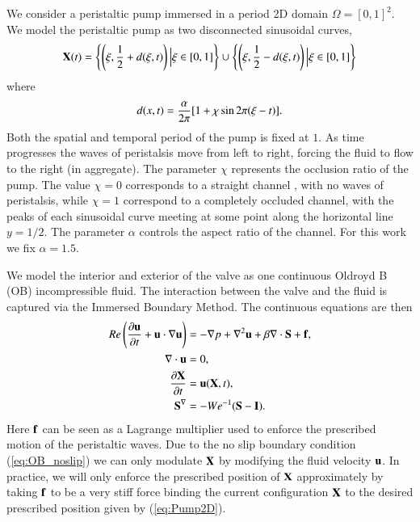 We consider a peristaltic pump immersed in a period 2D domain $\Omega=[0,1]^2$.
We model the peristaltic pump as two disconnected sinusoidal curves,
\begin{equation}
\mathbf{X}(t) =
\label{eq:Pump2D}
\left\{
\left(\xi, \frac{1}{2} + d(\xi,t)\right) \Big{|} \xi\in[0,1]
\right\}
\cup
\left\{
\left(\xi, \frac{1}{2} - d(\xi,t)\right) \Big{|} \xi\in[0,1]
\right\}
\end{equation}
where
\begin{equation}
\label{eq:d}
d(x,t) = \frac{\alpha}{2\pi}[1 + \chi \sin 2\pi(\xi - t)].\\
\end{equation}
Both the spatial and temporal period of the pump is fixed at $1$. As time progresses the waves of peristalsis move from left to right, forcing the fluid to flow to the right (in aggregate). The parameter $\chi$ represents the occlusion ratio of the pump. The value $\chi=0$ corresponds to a straight channel , with no waves of peristalsis, while $\chi=1$ correspond to a completely occluded channel, with the peaks of each sinusoidal curve meeting at some point along the horizontal line $y=1/2$. The parameter 
$\alpha$ controls  the aspect ratio of the channel. For this work we fix $\alpha=1.5$.

We model the interior and exterior of the valve as one continuous Oldroyd B (OB) incompressible fluid. The interaction between the valve and the fluid is captured via the Immersed Boundary Method. The continuous equations are then
\begin{align}
Re \left(\frac{\partial \mathbf{u}}{\partial t} + \mathbf{u}\cdot\nabla\mathbf{u} \right) &= -\nabla p +  \nabla^2 \mathbf{u} + \beta\nabla\cdot\mathbf{S} + \mathbf{f}, \label{eq:OB_momentum}\\ 
\nabla \cdot \mathbf{u} &= 0, \label{eq:OB_incompressibility}\\
\frac{\partial \mathbf{X}}{\partial t}  &= \mathbf{u}(\mathbf{X},t), \label{eq:OB_noslip}\\
\mathbf{S}^\nabla &= -{We}^{-1}(\mathbf{S} - \mathbf{I}). \label{eq:OB_stress}
\end{align}
Here $\mathbf{f}$ can be seen as a Lagrange multiplier used to enforce the prescribed motion of the peristaltic waves. Due to the no slip boundary condition (\ref{eq:OB_noslip}) we can only modulate $\mathbf{X}$ by modifying the fluid velocity $\mathbf{u}$. In practice,  we will only enforce the prescribed position of $\mathbf{X}$ approximately by taking $\mathbf{f}$ to be  a very stiff force binding the current configuration $\mathbf{X}$ to the desired prescribed position given by (\ref{eq:Pump2D}).

